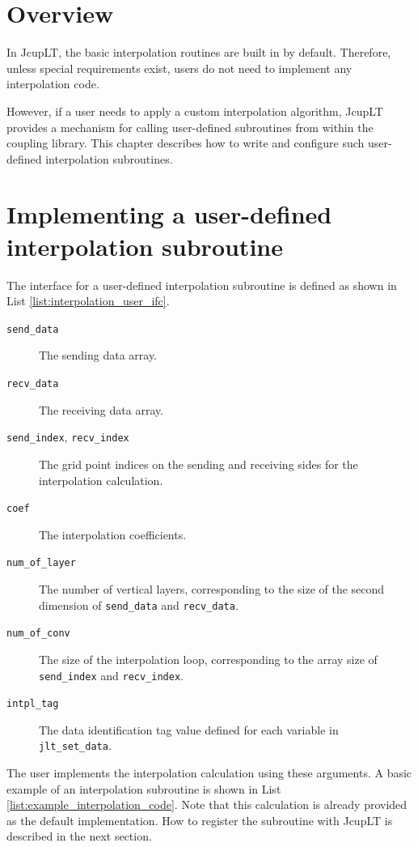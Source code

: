 \documentclass[11pt,a4paper]{report}
\newcommand{\lstref}[1]{List \ref{#1}}
\begin{document}
\section{Overview}
In JcupLT, the basic interpolation routines
are built in by default.
Therefore, unless special requirements exist,
users do not need to implement any interpolation code.

However, if a user needs to apply
a custom interpolation algorithm,
JcupLT provides a mechanism
for calling user-defined subroutines
from within the coupling library.
This chapter describes how to write
and configure such user-defined
interpolation subroutines.

\section{Implementing a user-defined interpolation subroutine}

The interface for a user-defined interpolation subroutine
is defined as shown in \lstref{list:interpolation_user_ifc}.

\begin{description}
\item[\texttt{send\_data}]
  The sending data array.
\item[\texttt{recv\_data}]
  The receiving data array.
\item[\texttt{send\_index}, \texttt{recv\_index}]
  The grid point indices on the sending and receiving sides
  for the interpolation calculation.
\item[\texttt{coef}]
  The interpolation coefficients.
\item[\texttt{num\_of\_layer}]
  The number of vertical layers,
  corresponding to the size of the second dimension
  of \texttt{send\_data} and \texttt{recv\_data}.
\item[\texttt{num\_of\_conv}]
  The size of the interpolation loop,
  corresponding to the array size
  of \texttt{send\_index} and \texttt{recv\_index}.
\item[\texttt{intpl\_tag}]
  The data identification tag value
  defined for each variable
  in \texttt{jlt\_set\_data}.
\end{description}

The user implements the interpolation calculation
using these arguments.
A basic example of an interpolation subroutine
is shown in \lstref{list:example_interpolation_code}.
Note that this calculation is already provided
as the default implementation.
How to register the subroutine with JcupLT
is described in the next section.
\end{document}
